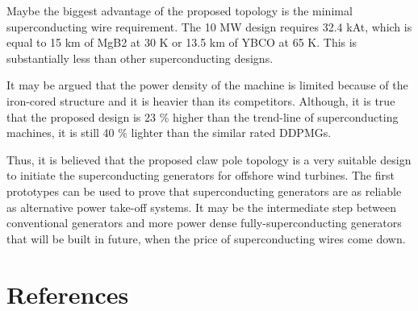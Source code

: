 \documentclass[12pt]{iopart}
\begin{document}
Maybe the biggest advantage of the proposed topology is the minimal superconducting wire requirement. The 10 MW design requires 32.4 kAt, which is equal to 15 km of MgB2 at 30 K or 13.5 km of YBCO at 65 K. This is substantially less than other superconducting designs.

It may be argued that the power density of the machine is limited because of the iron-cored structure and it is heavier than its competitors. Although, it is true that the proposed design is 23 \% higher than the trend-line of superconducting machines, it is still 40 \% lighter than the similar rated DDPMGs. 

Thus, it is believed that the proposed claw pole topology is a very suitable design to initiate the superconducting generators for offshore wind turbines. The first prototypes can be used to prove that superconducting generators are as reliable as alternative power take-off systems. It may be the intermediate step between conventional generators and more power dense fully-superconducting generators that will be built in future, when the price of superconducting wires come down.


\section*{References}



\end{document}
